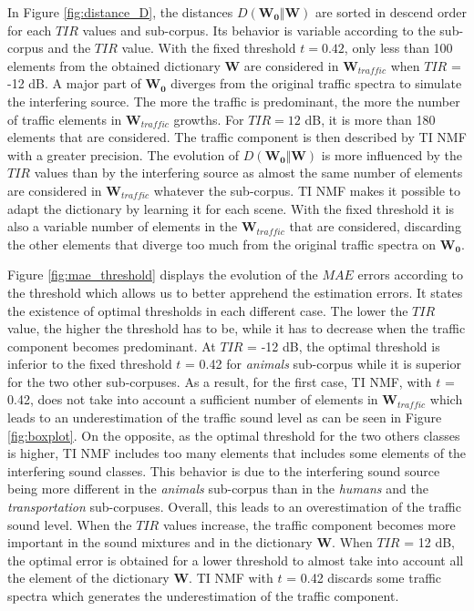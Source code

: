 \documentclass[12pt,english,twoside]{article}
\begin{document}
In Figure \ref{fig:distance_D}, the distances $D(\mathbf{W_0}\Vert \mathbf{W})$ are sorted in descend order for each $TIR$ values and sub-corpus. Its behavior is variable according to the sub-corpus and the $TIR$ value.
With the fixed threshold $t = 0.42$, only less than 100 elements from the obtained dictionary $\mathbf{W}$ are considered in $\mathbf{W}_{traffic}$ when $TIR$ = -12 dB. A major part of $\mathbf{W_0}$ diverges from the original traffic spectra to simulate the interfering source. The more the traffic is predominant, the more the number of traffic elements in $\mathbf{W}_{traffic}$ growths. For $TIR = 12$ dB, it is more than 180 elements that are considered. The traffic component is then described by TI NMF with a greater precision. The evolution of $D(\mathbf{W_0}\Vert \mathbf{W})$ is more influenced by the $TIR$ values than by the interfering source as almost the same number of elements are considered in $\mathbf{W}_{traffic}$ whatever the sub-corpus.
TI NMF makes it possible to adapt the dictionary by learning it for each scene. With the fixed threshold it is also a variable number of elements in the $\mathbf{W}_{traffic}$ that are considered,  discarding the other elements that diverge too much from the original traffic spectra on $\mathbf{W_0}$.

Figure \ref{fig:mae_threshold} displays the evolution of the $MAE$ errors according to the threshold which allows us to better apprehend the estimation errors. It states the existence of optimal thresholds in each different case. The lower the $TIR$ value, the higher the threshold has to be, while it has to decrease when the traffic component becomes predominant.
At $TIR$ = -12 dB, the optimal threshold is inferior to the fixed threshold $t$ = 0.42 for \textit{animals} sub-corpus while it is superior for the two other sub-corpuses. As a result, for the first case, TI NMF, with $t$ = 0.42, does not take into account a sufficient number of elements in $\mathbf{W}_{traffic}$ which leads to an underestimation of the traffic sound level as can be seen in Figure \ref{fig:boxplot}. On the opposite, as the optimal threshold for the two others classes is higher, TI NMF includes too many elements that includes some elements of the interfering sound classes. This behavior is due to the interfering sound source being more different in the \textit{animals} sub-corpus than in the \textit{humans} and the \textit{transportation} sub-corpuses. Overall, this leads to an overestimation of the traffic sound level.
When the $TIR$ values increase, the traffic component becomes more important in the sound mixtures and in the dictionary $\mathbf{W}$. When $TIR$ = 12 dB, the optimal error is obtained for a lower threshold to almost take into account all the element of the dictionary $\mathbf{W}$. TI NMF with $t$ = 0.42 discards some traffic spectra which generates the underestimation of the traffic component.
\end{document}
